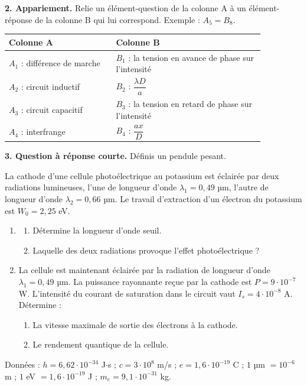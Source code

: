 \documentclass[11pt]{article}
\begin{document}
\medskip
\noindent\textbf{2. Appariement.} Relie un élément-question de la colonne A à un élément-réponse de la colonne B qui lui correspond. Exemple : $A_5 = B_8$.

\begin{center}\renewcommand{\arraystretch}{1.8}
\begin{tabular}{|p{0.36\linewidth}|p{0.5\linewidth}|}
\hline
\textbf{Colonne A} & \textbf{Colonne B} \\
\hline
$A_1$ : différence de marche & $B_1$ : la tension en avance de phase sur l'intensité \\
\hline
$A_2$ : circuit inductif & $B_2$ : $\dfrac{\lambda D}{a}$ \\
\hline
$A_3$ : circuit capacitif & $B_3$ : la tension en retard de phase sur l'intensité \\
\hline
$A_4$ : interfrange & $B_4$ : $\dfrac{ax}{D}$ \\
\hline
\end{tabular}
\end{center}

\noindent\textbf{3. Question à réponse courte.} Définis un pendule pesant.

La cathode d'une cellule photoélectrique au potassium est éclairée par deux radiations lumineuses, l'une de longueur d'onde $\lambda_1 = 0{,}49$ µm, l'autre de longueur d'onde $\lambda_2 = 0{,}66$ µm. Le travail d'extraction d'un électron du potassium est $W_0 = 2{,}25$ eV.

\begin{enumerate}
  \item \begin{enumerate}[label=\alph*.]
    \item Détermine la longueur d'onde seuil.
    \item Laquelle des deux radiations provoque l'effet photoélectrique ?
  \end{enumerate}
  \item La cellule est maintenant éclairée par la radiation de longueur d'onde $\lambda_1 = 0{,}49$ µm. La puissance rayonnante reçue par la cathode est $P = 9\cdot10^{-7}$ W. L'intensité du courant de saturation dans le circuit vaut $I_s = 4\cdot10^{-8}$ A. Détermine :
  \begin{enumerate}[label=\alph*.]
    \item La vitesse maximale de sortie des électrons à la cathode.
    \item Le rendement quantique de la cellule.
  \end{enumerate}
\end{enumerate}
\noindent Données : $h = 6{,}62\cdot10^{-34}$ J$\cdot$s ; $c = 3\cdot10^8$ m/s ; $e = 1{,}6\cdot10^{-19}$ C ; $1$ µm $= 10^{-6}$ m ; $1$ eV $= 1{,}6\cdot10^{-19}$ J ; $m_e = 9{,}1\cdot10^{-31}$ kg.
\end{document}
